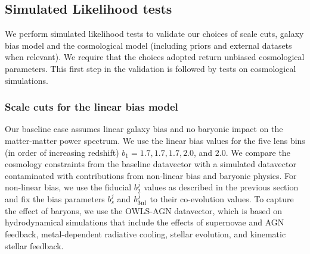 \documentclass[aps, prd,twocolumn,superscriptaddress,nofootinbib,preprintnumbers]{revtex4-1}
\newcommand{\IR}[1]{{\color{red}[\textbf{Note for IR}: #1]}}
\begin{document}



\subsection{Simulated Likelihood tests}\label{sec:simlike_analysis}


We perform simulated likelihood tests to validate our choices of scale cuts, galaxy bias model and the cosmological model (including priors and external datasets when relevant). We require that the choices adopted return unbiased cosmological parameters. This first step in the validation is followed by tests on cosmological simulations. 

\subsubsection{Scale cuts for the linear bias model}
\label{sec:sc_linbias}



Our baseline case assumes linear galaxy bias and no baryonic impact on the matter-matter power spectrum. We use the linear bias values for the five lens bins (in order of increasing redshift) $b_1 = 1.7, 1.7, 1.7, 2.0$, and  $2.0$. We compare the cosmology constraints from the baseline datavector with a simulated datavector contaminated with contributions from non-linear bias and baryonic physics. For non-linear bias, we use the fiducial $b^j_2$ values as described in the previous section and fix the bias parameters $b^j_s$ and $b^j_{\rm 3nl}$ to their co-evolution values. To capture the effect of baryons, we use the OWLS-AGN datavector, which is based on hydrodynamical simulations that include the effects of supernovae and AGN feedback, metal-dependent radiative cooling, stellar evolution, and kinematic stellar feedback. 
\end{document}
